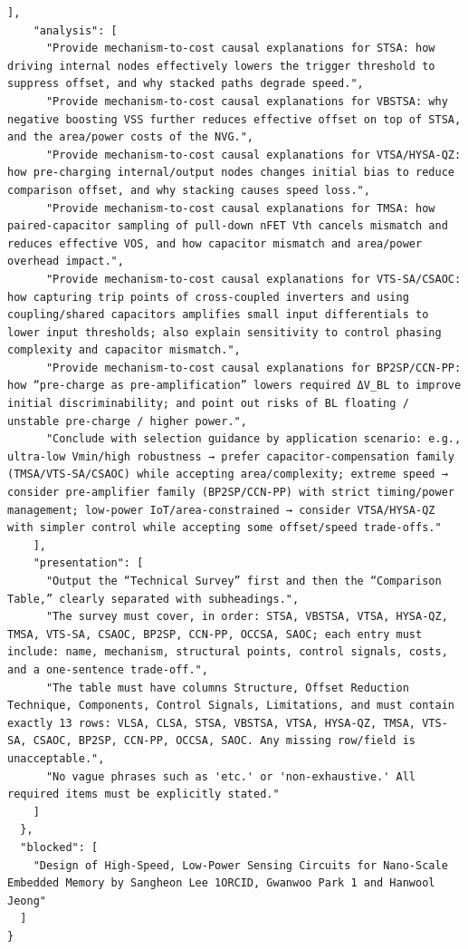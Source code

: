 \documentclass[11pt]{article}
\begin{document}
\begin{tcolorbox}[
  breakable,
  colback=porcelain,
  colframe=gray!75!black,
  left=6pt, right=6pt, top=6pt, bottom=6pt,
  fontupper=\small
]
\begin{lstlisting}[basicstyle=\ttfamily\footnotesize, breaklines=true, frame=none, numbers=none]
    ],
    "analysis": [
      "Provide mechanism-to-cost causal explanations for STSA: how driving internal nodes effectively lowers the trigger threshold to suppress offset, and why stacked paths degrade speed.",
      "Provide mechanism-to-cost causal explanations for VBSTSA: why negative boosting VSS further reduces effective offset on top of STSA, and the area/power costs of the NVG.",
      "Provide mechanism-to-cost causal explanations for VTSA/HYSA-QZ: how pre-charging internal/output nodes changes initial bias to reduce comparison offset, and why stacking causes speed loss.",
      "Provide mechanism-to-cost causal explanations for TMSA: how paired-capacitor sampling of pull-down nFET Vth cancels mismatch and reduces effective VOS, and how capacitor mismatch and area/power overhead impact.",
      "Provide mechanism-to-cost causal explanations for VTS-SA/CSAOC: how capturing trip points of cross-coupled inverters and using coupling/shared capacitors amplifies small input differentials to lower input thresholds; also explain sensitivity to control phasing complexity and capacitor mismatch.",
      "Provide mechanism-to-cost causal explanations for BP2SP/CCN-PP: how “pre-charge as pre-amplification” lowers required ΔV_BL to improve initial discriminability; and point out risks of BL floating / unstable pre-charge / higher power.",
      "Conclude with selection guidance by application scenario: e.g., ultra-low Vmin/high robustness → prefer capacitor-compensation family (TMSA/VTS-SA/CSAOC) while accepting area/complexity; extreme speed → consider pre-amplifier family (BP2SP/CCN-PP) with strict timing/power management; low-power IoT/area-constrained → consider VTSA/HYSA-QZ with simpler control while accepting some offset/speed trade-offs."
    ],
    "presentation": [
      "Output the “Technical Survey” first and then the “Comparison Table,” clearly separated with subheadings.",
      "The survey must cover, in order: STSA, VBSTSA, VTSA, HYSA-QZ, TMSA, VTS-SA, CSAOC, BP2SP, CCN-PP, OCCSA, SAOC; each entry must include: name, mechanism, structural points, control signals, costs, and a one-sentence trade-off.",
      "The table must have columns Structure, Offset Reduction Technique, Components, Control Signals, Limitations, and must contain exactly 13 rows: VLSA, CLSA, STSA, VBSTSA, VTSA, HYSA-QZ, TMSA, VTS-SA, CSAOC, BP2SP, CCN-PP, OCCSA, SAOC. Any missing row/field is unacceptable.",
      "No vague phrases such as 'etc.' or 'non-exhaustive.' All required items must be explicitly stated."
    ]
  },
  "blocked": [
    "Design of High-Speed, Low-Power Sensing Circuits for Nano-Scale Embedded Memory by Sangheon Lee 1ORCID, Gwanwoo Park 1 and Hanwool Jeong"
  ]
}
\end{lstlisting}


\end{tcolorbox}
\end{document}
